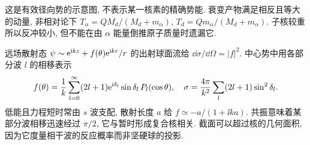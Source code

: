 \begin{center}
\end{center}
这是有效径向势的示意图, 不表示某一核素的精确势能. 衰变产物满足相反且等大的动量, 非相对论下 $T_\alpha=Q M_d/(M_d+m_\alpha)$, $T_d=Qm_\alpha/(M_d+m_\alpha)$. 子核较重所以反冲较小, 但不能在由 $\alpha$ 能量倒推原子质量时遗漏它.

远场散射态 $\psi\sim\mathrm e^{\mathrm i kz}+f(\theta)\mathrm e^{\mathrm i kr}/r$ 的出射球面流给 $\dd\sigma/\dd\Omega=|f|^2$. 中心势中用各部分波 $l$ 的相移表示
\begin{equation}
 f(\theta)=\frac1k\sum_{l=0}^\infty(2l+1)\mathrm e^{\mathrm i\delta_l}\sin\delta_l\,P_l(\cos\theta),
 \quad \sigma=\frac{4\pi}{k^2}\sum_l(2l+1)\sin^2\delta_l.
\end{equation}
低能且力程短时常由 $s$ 波支配, 散射长度 $a$ 给 $f\simeq-a/(1+\ii ka)$. 共振意味着某部分波相移迅速经过 $\pi/2$, 它与暂时形成复合核相关. 截面可以超过核的几何面积, 因为它度量相干波的反应概率而非坚硬球的投影.
